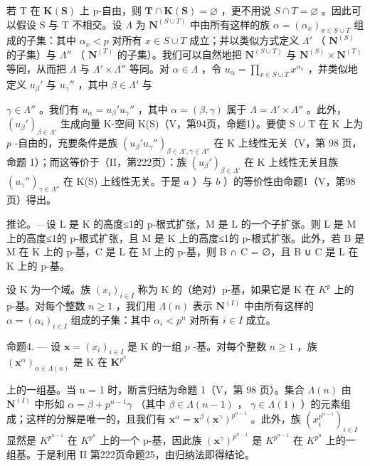 若 T 在 \(\mathbf{K}(\mathbf{S})\) 上 p-自由，则 \(\mathbf{T} \cap \mathbf{K}(\mathbf{S}) = \varnothing\) ，更不用说 \(S \cap T = \varnothing\) 。因此可以假设 S 与 T 不相交。设 \(\Lambda\) 为 \(\mathbf{N}^{(S \cup T)}\) 中由所有这样的族 \(\alpha = (\alpha_x)_{x \in S \cup T}\) 组成的子集：其中 \(\alpha_x < p\) 对所有 \(x \in S \cup T\) 成立；并以类似方式定义 \(\Lambda'\) （ \(\mathbf{N}^{(S)}\) 的子集）与 \(\Lambda''\) （ \(\mathbf{N}^{(T)}\) 的子集）。我们可以自然地把 \(\mathbf{N}^{(S \cup T)}\) 与 \(\mathbf{N}^{(S)} \times \mathbf{N}^{(T)}\) 等同，从而把 \(\Lambda\) 与 \(\Lambda' \times \Lambda''\) 等同。对 \(\alpha \in \Lambda\) ，令 \(u_\alpha = \prod_{x \in S \cup T} x^{\alpha_x}\) ，并类似地定义 \(u_\beta'\) 与 \(u_\gamma''\) ，其中 \(\beta \in \Lambda'\) 与

\(\gamma \in \Lambda''\) 。我们有 \(u_{\alpha} = u_{\beta}' u_{\gamma}''\) ，其中 \(\alpha = (\beta, \gamma)\) 属于 \(\Lambda = \Lambda' \times \Lambda''\) 。此外， \((u_{\beta}')_{\beta \in \Lambda'}\) 生成向量 K-空间 K(S)（V，第94页，命题1）。要使 S \(\cup\) T 在 K 上为 \(p\) -自由的，充要条件是族 \((u_{\beta}' u_{\gamma}'')_{\beta \in \Lambda', \gamma \in \Lambda''}\) 在 K 上线性无关（V，第 98 页，命题 1）；而这等价于（II，第222页）：族 \((u_{\beta}')_{\beta \in \Lambda'}\) 在 K 上线性无关且族 \((u_{\gamma}'')_{\gamma \in \Lambda''}\) 在 K(S) 上线性无关。于是 \(a\) ）与 \(b\) ）的等价性由命题1（V，第98页）得出。

推论。---设 L 是 K 的高度≤1的 p-根式扩张，M 是 L 的一个子扩张。则 L 是 M 上的高度≤1的 p-根式扩张，且 M 是 K 上的高度≤1的 p-根式扩张。此外，若 B 是 M 在 K 上的 p-基，C 是 L 在 M 上的 p-基，则 B ∩ C = ∅，且 B ∪ C 是 L 在 K 上的 p-基。

设 K 为一个域。族 \((x_{i})_{i\in I}\) 称为 K 的（绝对）p-基，如果它是 K 在 \(K^{p}\) 上的 p-基。对每个整数 \(n\geqslant1\) ，我们用 \(\Lambda(n)\) 表示 \(\mathbf{N}^{(I)}\) 中由所有这样的 \(\alpha=(\alpha_{i})_{i\in I}\) 组成的子集：其中 \(\alpha_{i}<p^{n}\) 对所有 \(i\in I\) 成立。

命题4. --- 设 \(\mathbf{x} = (x_i)_{i \in I}\) 是 K 的一组 \(p\) -基。对每个整数 \(n \geqslant 1\) ，族 \((\mathbf{x}^\alpha)_{\alpha \in \Lambda(n)}\) 是 K 在 \(\mathbf{K}^{p^n}\)

上的一组基。当 n = 1 时，断言归结为命题 1（V，第 98 页）。集合 \(\Lambda(n)\) 由 \(\mathbf{N}^{(I)}\) 中形如 \(\alpha = \beta + p^{n-1}\gamma\) （其中 \(\beta \in \Lambda(n-1)\) ， \(\gamma \in \Lambda(1)\) ）的元素组成；这样的分解是唯一的，且我们有 \(\mathbf{x}^{\alpha} = \mathbf{x}^{\beta}(\mathbf{x}^{\gamma})^{p^{n-1}}\) 。此外，族 \((x_{i}^{p^{n-1}})_{i \in I}\) 显然是 \(K^{p^{n-1}}\) 在 \(K^{p^n}\) 上的一个 p-基，因此族 \((\mathbf{x}^{\gamma})^{p^{n-1}}\) 是 \(K^{p^{n-1}}\) 在 \(K^{p^n}\) 上的一组基。于是利用 II 第222页命题25，由归纳法即得结论。

